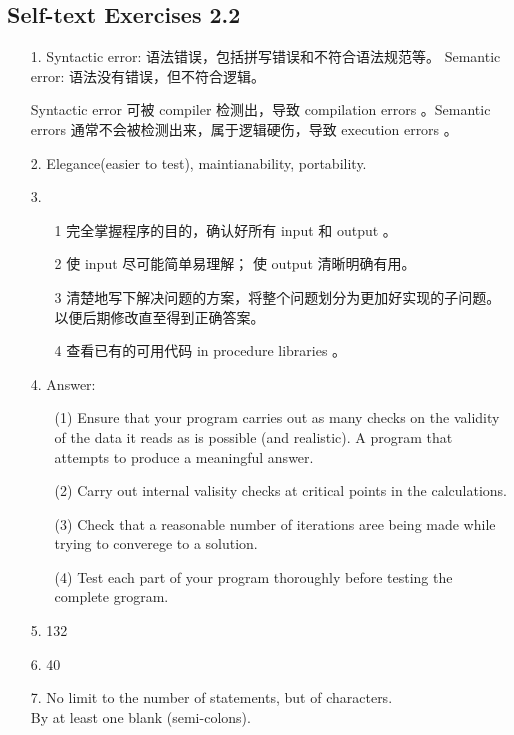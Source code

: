 \documentclass[a4paper,titlepage]{report}
\begin{document}
\subsection*{Self-text Exercises 2.2}

\begin{itemize}
  \item[1.]
  Syntactic error: 语法错误，包括拼写错误和不符合语法规范等。
  Semantic error: 语法没有错误，但不符合逻辑。

  Syntactic error 可被 compiler 检测出，导致 compilation errors 。Semantic errors 通常不会被检测出来，属于逻辑硬伤，导致 execution errors 。

  \item[2.]
  Elegance(easier to test), maintianability, portability.

  \item[3.]
  \begin{itemize}
    \item[1]
    完全掌握程序的目的，确认好所有 input 和 output 。

    \item[2]
    使 input 尽可能简单易理解； 使 output 清晰明确有用。

    \item[3]
    清楚地写下解决问题的方案，将整个问题划分为更加好实现的子问题。以便后期修改直至得到正确答案。

    \item[4]
    查看已有的可用代码 in procedure libraries 。

  \end{itemize}

  \item[4.]
  Answer: \\
  \begin{itemize}
    \item[(1)]
    Ensure that your program carries out as many checks on the validity of the data it reads as is possible (and realistic). A program that attempts to produce a meaningful answer.

    \item[(2)]
    Carry out internal valisity checks at critical points in the calculations.

    \item[(3)]
    Check that a reasonable number of iterations aree being made while trying to converege to a solution.

    \item[(4)]
    Test each part of your program thoroughly before testing the complete grogram.

  \end{itemize}

  \item[5.]
  132

  \item[6.]
  40

  \item[7.]
  No limit to the number of statements, but of characters. \\
  By at least one blank (semi-colons).

  \end{itemize}
\end{document}
